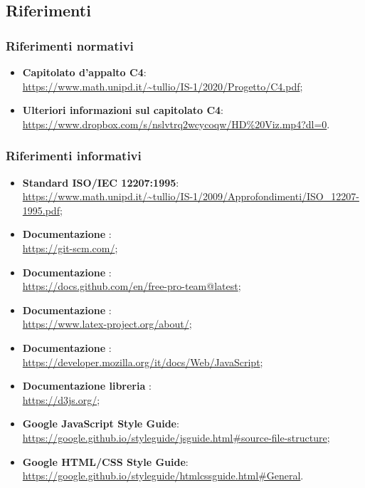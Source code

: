 \subsection{Riferimenti}
\label{sub:riferimenti}

\subsubsection{Riferimenti normativi}

\begin{itemize}
    \item \textbf{Capitolato d'appalto \textsc{C4}}: \\
    \url{https://www.math.unipd.it/~tullio/IS-1/2020/Progetto/C4.pdf};
    \item \textbf{Ulteriori informazioni sul capitolato C4}: \\
    \url{https://www.dropbox.com/s/nslvtrq2wcycoqw/HD\%20Viz.mp4?dl=0}.
\end{itemize}

\subsubsection{Riferimenti informativi}
\begin{itemize}
    \item \textbf{Standard ISO/IEC 12207:1995}: \\
    \url{https://www.math.unipd.it/~tullio/IS-1/2009/Approfondimenti/ISO_12207-1995.pdf};
    \item \textbf{Documentazione }: \\
    \url{https://git-scm.com/};
    \item \textbf{Documentazione }: \\
    \url{https://docs.github.com/en/free-pro-team@latest};
    \item \textbf{Documentazione \glossario{\LaTeX}}: \\
    \url{https://www.latex-project.org/about/};
    \item \textbf{Documentazione }: \\
    \url{https://developer.mozilla.org/it/docs/Web/JavaScript};
    \item \textbf{Documentazione libreria }: \\
    \url{https://d3js.org/};
	\item \textbf{Google JavaScript Style Guide}: \\
	\url{https://google.github.io/styleguide/jsguide.html#source-file-structure};
	\item \textbf{Google HTML/CSS Style Guide}: \\
	\url{https://google.github.io/styleguide/htmlcssguide.html#General}.
\end{itemize}
